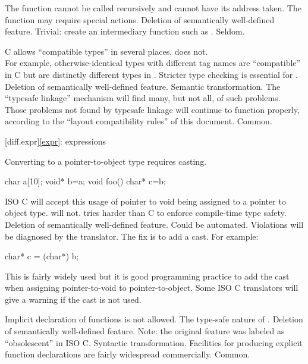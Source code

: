 \change The  function cannot be called recursively and cannot have its address taken.
\rationale
The  function may require special actions.
\effect
Deletion of semantically well-defined feature.
\difficulty
Trivial: create an intermediary function such as
.
\howwide
Seldom.

\change C allows ``compatible types'' in several places, \Cpp{} does not.\\
For example,
otherwise-identical  types with different tag names
are ``compatible'' in C but are distinctly different types
in \Cpp{}.
\rationale
Stricter type checking is essential for \Cpp{}.
\effect
Deletion of semantically well-defined feature.
\difficulty
Semantic transformation.
The ``typesafe linkage'' mechanism will find many, but not all,
of such problems.
Those problems not found by typesafe linkage will continue to
function properly,
according to the ``layout compatibility rules'' of this
document.
\howwide
Common.

[diff.expr]{\ref{expr}: expressions}

\change Converting  to a pointer-to-object type requires casting.

\begin{codeblock}
char a[10];
void* b=a;
void foo() {
  char* c=b;
}
\end{codeblock}

ISO C will accept this usage of pointer to void being assigned
to a pointer to object type.
\Cpp{} will not.
\rationale
\Cpp{} tries harder than C to enforce compile-time type safety.
\effect
Deletion of semantically well-defined feature.
\difficulty
Could be automated.
Violations will be diagnosed by the \Cpp{} translator.
The
fix is to add a  cast.
For example:

\begin{codeblock}
char* c = (char*) b;
\end{codeblock}

\howwide
This is fairly widely used but it is good
programming practice to add the cast when assigning pointer-to-void to pointer-to-object.
Some ISO C translators will give a warning
if the cast is not used.

\change Implicit declaration of functions is not allowed.
\rationale
The type-safe nature of \Cpp{}.
\effect
Deletion of semantically well-defined feature.
Note: the original feature was labeled as ``obsolescent'' in ISO C.
\difficulty
Syntactic transformation.
Facilities for producing explicit function declarations are fairly
widespread commercially.
\howwide
Common.

